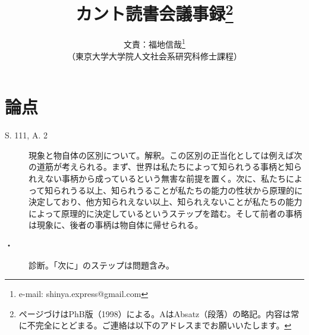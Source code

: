 \documentclass[a4j, 12pt,leqno]{jsarticle}
\title{カント読書会議事録\thanks{ページづけはPhB版（1998）による。AはAbsatz（段落）の略記。内容は常に不完全にとどまる。ご連絡は以下のアドレスまでお願いいたします。}}
\author{文責：福地信哉\thanks{e-mail: shinya.express@gmail.com}\\ （東京大学大学院人文社会系研究科修士課程）}
\begin{document}
\maketitle


\section*{論点}
\begin{description}
\item[S. 111, A. 2]現象と物自体の区別について。解釈。この区別の正当化としては例えば次の道筋が考えられる。まず、世界は私たちによって知られうる事柄と知られえない事柄から成っているという無害な前提を置く。次に、私たちによって知られうる以上、知られうることが私たちの能力の性状から原理的に決定しており、他方知られえない以上、知られえないことが私たちの能力によって原理的に決定しているというステップを踏む。そして前者の事柄は現象に、後者の事柄は物自体に帰せられる。
\begin{prooftree}
\end{prooftree}
\item[・]診断。「次に」のステップは問題含み。

\end{description}
\end{document}
